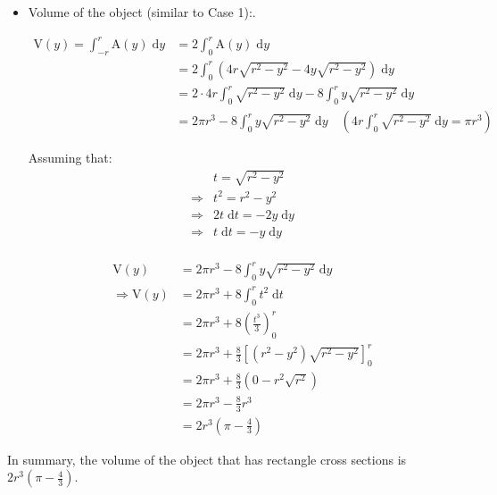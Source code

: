 \documentclass[12pt]{article}
\begin{document}
\begin{itemize}
    \item Volume of the object (similar to Case 1):. \par
    \begin{align*}
        \mathrm{V}(y) = \int_{-r}^r \mathrm{A}(y)\; \mathrm{d}y
        &=2 \int_{0}^r \mathrm{A}(y)\; \mathrm{d}y \\
        &=2 \int_{0}^r\left( 4r\sqrt{r^2-y^2}-4y\sqrt{r^2-y^2}\right) \; \mathrm{d}y\\
        &=2\cdot 4r \int_{0}^r \sqrt{r^2-y^2}\; \mathrm{d}y
        - 8\int_{0}^r y\sqrt{r^2-y^2} \; \mathrm{d}y\\
        &=2\pi r^3
        - 8\int_{0}^r y\sqrt{r^2-y^2} \; \mathrm{d}y
        \quad \left(4r \int_{0}^r \sqrt{r^2-y^2} \; \mathrm{d}y=\pi r^3\right)
    \end{align*}
    
    Assuming that:
    \begin{align*}
        &t=\sqrt{r^2-y^2}\\
        \Longrightarrow &t^2 = r^2-y^2\\
        \Longrightarrow &2t\; \mathrm{d}t = -2y\;\mathrm{d}y\\
        \Longrightarrow &t\; \mathrm{d}t = -y\;\mathrm{d}y\\
    \end{align*}
    
    \begin{align*}
        \mathrm{V}(y) &=2\pi r^3
        - 8\int_{0}^r y\sqrt{r^2-y^2} \; \mathrm{d}y\\
        \Longrightarrow \mathrm{V}(y)
        &=2\pi r^3
        + 8\int_{0}^r t^2 \; \mathrm{d}t\\
        &=2\pi r^3
        + 8\left(\frac{t^3}{3}\right)_0^r\\
        &=2\pi r^3
        + \frac{8}{3}\left[\left(r^2-y^2 \right) \sqrt{r^2-y^2}\right]_0^r \\
        &=2\pi r^3
        + \frac{8}{3}\left(0 -r^2 \sqrt{r^2} \right) \\
        &=2\pi r^3- \frac{8}{3}r^3\\
        &=2r^3 \left(\pi -\frac{4}{3}\right)
    \end{align*}

\end{itemize}
    
\noindent In summary, the volume of the object that has rectangle cross sections is $ 2r^3\left(\pi -\frac{4}{3}\right)$.
    
\end{document}

